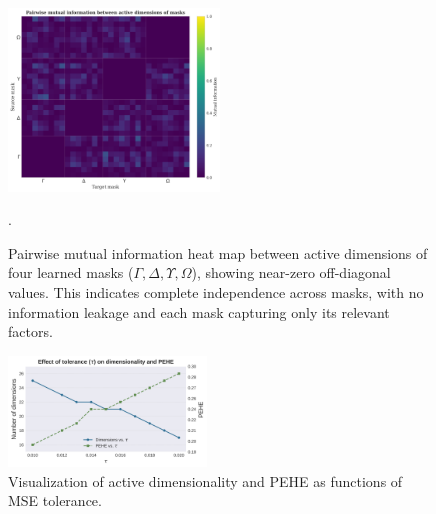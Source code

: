 \documentclass[doubleblind]{ecai}
\begin{document}
		\begin{figure}[h]
	\centering
	
	\includegraphics[width=0.5\textwidth]{Images/MI.png}
	
	\caption{
		Pairwise mutual information heat map between active dimensions of four learned masks (\(\Gamma, \Delta, \Upsilon, \Omega\)), 
		showing near-zero off-diagonal values. This indicates complete independence across masks, with no information leakage 
		and each mask capturing only its relevant factors.
	}



	
	.
	
	
	\label{fig:mi}
	
\end{figure}


	
	
	\begin{figure}[h]
		\centering
		
		\includegraphics[width=0.47\textwidth]{Images/tol_vs_dims_pehe_new.png}
		
		
		
		\caption{Visualization of active dimensionality and PEHE as functions of MSE tolerance.}
		
		\label{fig:tolerance}
		
	\end{figure}
	
\end{document}
